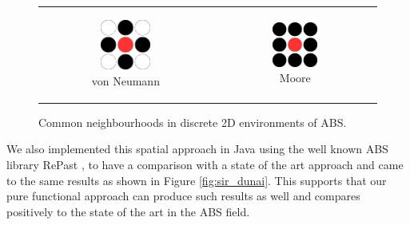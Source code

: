 \begin{figure}
\begin{center}
	\begin{tabular}{c c}
		\begin{subfigure}[b]{0.3\textwidth}
			\centering
			\includegraphics[width=0.5\textwidth, angle=0]{./fig/timedriven/neumann.png}
			\caption{von Neumann}
			\label{fig:neumann_neighbourhood}
		\end{subfigure}
    	&
		\begin{subfigure}[b]{0.3\textwidth}
			\centering
			\includegraphics[width=0.5\textwidth, angle=0]{./fig/timedriven/moore.png}
			\caption{Moore}
			\label{fig:moore_neighbourhood}
		\end{subfigure}
    \end{tabular}
	\caption[Common neighbourhoods in discrete 2D environments of ABS]{Common neighbourhoods in discrete 2D environments of ABS.}
	\label{fig:abs_neighbourhoods}
\end{center}
\end{figure}

We also implemented this spatial approach in Java using the well known ABS library RePast \cite{north_complex_2013}, to have a comparison with a state of the art approach and came to the same results as shown in Figure \ref{fig:sir_dunai}. This supports that our pure functional approach can produce such results as well and compares positively to the state of the art in the ABS field.

